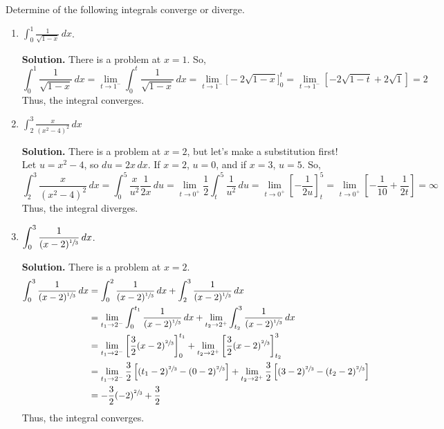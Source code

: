 \begin{Example}{}{}
    Determine of the following integrals converge or diverge.
    \begin{enumerate}[label=(\roman*)]
        \item $ \displaystyle \int_{0}^{1} \frac{1}{\sqrt{1-x}} \, d{x} $.

              \textbf{Solution.} There is a problem at $ x=1 $. So,
              \[ \int_{0}^{1} \frac{1}{\sqrt{1-x}} \, d{x}
                  =\lim\limits_{{t} \to {1^-}} \int_{0}^{t} \frac{1}{\sqrt{1-x}} \, d{x}
                  =\lim\limits_{{t} \to {1^-}}\bigl[-2\sqrt{1-x}\bigr]_0^t
                  =\lim\limits_{{t} \to {1^-}}[-2\sqrt{1-t}+2\sqrt{1}]
                  =2
              \]
              Thus, the integral converges.
        \item $ \displaystyle \int_{2}^{3} \frac{x}{(x^2-4)^2}\, d{x}  $

              \textbf{Solution.} There is a problem at $ x=2 $,
              but let's make a substitution first! Let $ u=x^2-4 $, so $ du=2x\,dx $. If $ x=2 $,
              $ u=0 $, and if $ x=3 $, $ u=5 $. So,
              \[ \int_{2}^{3} \frac{x}{(x^2-4)^2}\, d{x}
                  =\int_{0}^{5} \frac{x}{u^2} \frac{1}{2x} \, d{u}
                  =\lim\limits_{{t} \to {0^+}} \frac{1}{2} \int_{t}^{5} \frac{1}{u^2}\, d{u}
                  =\lim\limits_{{t} \to {0^+}}\left[-\frac{1}{2u} \right]_t^5
                  =\lim\limits_{{t} \to {0^+}}\left[ -\frac{1}{10} +\frac{1}{2t} \right]
                  =\infty
              \]
              Thus, the integral diverges.
        \item $ \displaystyle \int_{0}^{3} \frac{1}{(x-2)^{\sfrac{1}{3} }}\, d{x}  $.

              \textbf{Solution.} There is a problem at $ x=2 $.
              \begin{align*}
                  \int_{0}^{3} \frac{1}{(x-2)^{\sfrac{1}{3} }}\, d{x}
                   & =\int_{0}^{2} \frac{1}{(x-2)^{\sfrac{1}{3}}} \, d{x}+\int_{2}^{3} \frac{1}{(x-2)^{\sfrac{1}{3} }} \, d{x} \\
                   & =\lim\limits_{{t_1} \to {2^-}} \int_{0}^{t_1} \frac{1}{(x-2)^{\sfrac{1}{3}}}  \, d{x} +
                  \lim\limits_{{t_2} \to {2^+}} \int_{t_2}^{3} \frac{1}{(x-2)^{\sfrac{1}{3}}} \, d{x}                          \\
                   & =\lim\limits_{{t_1} \to {2^-}} \left[ \frac{3}{2}(x-2)^{\sfrac{2}{3}}\right]_0^{t_1}+
                  \lim\limits_{{t_2} \to {2^+}}\left[ \frac{3}{2}(x-2)^{\sfrac{2}{3}}\right]_{t_2}^{3}                         \\
                   & =\lim\limits_{{t_1} \to {2^-}} \frac{3}{2} \left[ (t_1-2)^{\sfrac{2}{3}} -(0-2)^{\sfrac{2}{3}}\right]
                  +\lim\limits_{{t_2} \to {2^+}} \frac{3}{2} \left[ (3-2)^{\sfrac{2}{3}}-(t_2-2)^{\sfrac{2}{3}} \right]        \\
                   & =-\frac{3}{2} (-2)^{\sfrac{2}{3}}+\frac{3}{2}
              \end{align*}
              Thus, the integral converges.
    \end{enumerate}
\end{Example}

